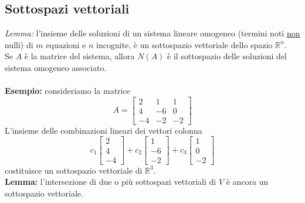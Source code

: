 \documentclass[italian]{article}
\newcommand{\ins}[1]{\text{$\mathbb{#1}$}}
\begin{document}
\subsection{Sottospazi vettoriali}
\textit{Lemma:} l'insieme delle soluzioni di un sistema lineare omogeneo (termini noti \underline{non} nulli) di $m$ equazioni e $n$ incognite, è un sottospazio vettoriale dello spazio $\ins{R}^n$.\\[2mm]
Se $A$ è la matrice del sistema, allora $N(A)$ è il sottospazio delle soluzioni del sistema omogeneo associato.\\\\
\textbf{Esempio:} consideriamo la matrice
\[
	A =
	\begin{bmatrix}
		2 & 1 & 1 \\
		4 & -6 & 0 \\
		-4 & -2 & -2
	\end{bmatrix}
\]
L'insieme delle combinazioni lineari dei vettori colonna
\[
	c_1 
	\begin{bmatrix}
		2 \\ 4 \\ -4
	\end{bmatrix}
	+
	c_2
	\begin{bmatrix}
	1 \\ -6 \\ -2
	\end{bmatrix}
	+
	c_3
	\begin{bmatrix}
	1 \\ 0 \\ -2
	\end{bmatrix}
\]
costituisce un sottospazio vettoriale di $\ins{R}^3$.\\[2mm]
\textbf{Lemma:} l'intersezione di due o più sottospazi vettoriali di $V$ è ancora
un sottospazio vettoriale.
\pagebreak
\end{document}
